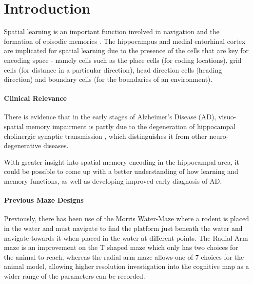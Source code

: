 

\pagebreak
\section{Introduction}

Spatial learning is an important function involved in navigation and the formation of episodic memories \cite{spatial_learning_memory}.
The hippocampus and medial entorhinal cortex are implicated for spatial learning due to the presence of the cells that are key for encoding space - namely cells such as the place cells (for coding locations), grid cells (for distance in a particular direction), head direction cells (heading direction) and boundary cells (for the boundaries of an environment).

\paragraph{Clinical Relevance}

There is evidence that in the early stages of Alzheimer's Disease (AD), visuo-spatial memory impairment \cite{Diagnosis} is partly due to the degeneration of hippocampal cholinergic synaptic transmission \cite{Impairments}, which distinguishes it from other neuro-degenerative diseases.


With greater insight into spatial memory encoding in the hippocampal area, it could be possible to come up with a better understanding of how learning and memory functions, as well as developing improved early diagnosis of AD.

\paragraph{Previous Maze Designs}

Previously, there has been use of the Morris Water-Maze \cite{morris_water_maze} where a rodent is placed in the water and must navigate to find the platform just beneath the water and navigate towards it when placed in the water at different points.
The Radial Arm maze \cite{radial_arm_maze} is an improvement on the T shaped maze \cite{t-maze} which only has two choices for the animal to reach, whereas the radial arm maze allows one of 7 choices for the animal model, allowing higher resolution investigation into the cognitive map as a wider range of the parameters can be recorded.

